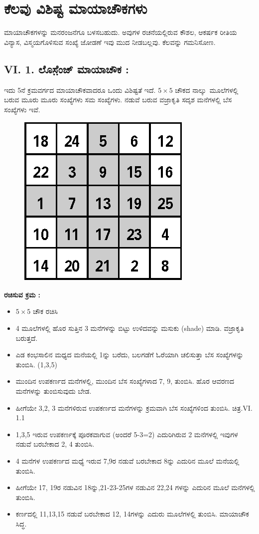 
\chapter{ಕೆಲವು ವಿಶಿಷ್ಟ ಮಾಯಾಚೌಕಗಳು}

ಮಾಯಾಚೌಕಗಳನ್ನು ಮನರಂಜನೆಗೂ ಬಳಸಬಹುದು. ಅವುಗಳ ರಚನೆಯಲ್ಲಿರುವ ಕೌಶಲ, ಆಕರ್ಷಕ ರೀತಿಯ ವಿನ್ಯಾಸ, ವಿಸ್ಮಯಗೊಳಿಸುವ ಸಂಖ್ಯೆ ಜೋಡಣೆ ಇವು ಮುದ ನೀಡಬಲ್ಲವು. ಕೆಲವನ್ನು ಗಮನಿಸೋಣ.

\section*{VI. 1. ಲೊಸೆ಼ಂಜ್ ಮಾಯಾಚೌಕ :}

ಇದು 5ನೆ ಕ್ರಮವರ್ಗದ ಮಾಯಾಚೌಕವಾದರೂ ಒಂದು ವಿಶಿಷ್ಟತೆ ಇದೆ. $5 \times 5$ ಚೌಕದ \hbox{ನಾಲ್ಕು ಮೂಲೆಗಳಲ್ಲಿ} ಬರುವ ಮೂರು ಮೂರು ಸಂಖ್ಯೆಗಳು ಸಮ ಸಂಖ್ಯೆಗಳು. ನಡುವೆ ಬರುವ ವಜ್ರಾಕೃತಿ ಸದೃಶ ಮನೆಗಳಲ್ಲಿ ಬೆಸ ಸಂಖ್ಯೆಗಳು ಇವೆ.
\begin{figure}[H]
\includegraphics{src/figures/chap5/fig5-1.eps}
\end{figure}

\noindent \textbf{ರಚಿಸುವ ಕ್ರಮ :}
\begin{itemize}
	\item $5 \times 5$ ಚೌಕ ರಚಿಸಿ
	\item 4 ಮೂಲೆಗಳಲ್ಲಿ ಹೊರ ಸುತ್ತಿನ 3 ಮನೆಗಳನ್ನು ಬಿಟ್ಟು ಉಳಿದವನ್ನು ಮಸುಕು (shade) ಮಾಡಿ. ವಜ್ರಾಕೃತಿ ಬರುತ್ತದೆ.
	\item ಎಡ ಕಂಭಸಾಲಿನ ಮಧ್ಯದ ಮನೆಯಲ್ಲಿ 1ನ್ನು ಬರೆದು, ಬಲಗಡೆಗೆ ಓರೆಯಾಗಿ ಚಲಿಸುತ್ತಾ ಬೆಸ ಸಂಖ್ಯೆಗಳನ್ನು ತುಂಬಿಸಿ. (1,3,5)
	\item ಮುಂದಿನ ಉಪಕರ್ಣದ ಮನೆಗಳಲ್ಲಿ, ಮುಂದಿನ ಬೆಸ ಸಂಖ್ಯೆಗಳಾದ 7, 9, ತುಂ\-ಬಿಸಿ. ಹೊರ ಆವರಣದ ಮನೆಗಳನ್ನು ತುಂಬಿಸುವುದು ಬೇಡ.
	\item ಹೀಗೆಯೇ 3,2, 3 ಮನೆಗಳಿರುವ ಉಪಕರ್ಣದ ಮನೆಗಳನ್ನು ಕ್ರಮವಾಗಿ ಬೆಸ ಸಂಖ್ಯೆ\-ಗಳಿಂದ ತುಂಬಿಸಿ. ಚಿತ್ರ.VI. 1.1
	\item 1,3,5 ಇರುವ ಉಪಕರ್ಣಕ್ಕೆ ಪೂರಕವಾಗುವ (ಅಂದರೆ 5-3=2) ಎದುರಿಗಿರುವ 2 ಮನೆಗಳಲ್ಲಿ ಇವುಗಳ ನಡುವೆ ಬರಬೇಕಾದ 2, 4 ತುಂಬಿಸಿ.
	\item 4 ಮನೆಗಳ ಉಪಕರ್ಣದ ಮಧ್ಯೆ ಇರುವ 7,9ರ ನಡುವೆ ಬರಬೇಕಾದ 8ನ್ನು ಎದುರಿನ ಮೂಲೆ ಮನೆಯಲ್ಲಿ ತುಂಬಿಸಿ.
	\item ಹೀಗೆಯೇ 17, 19ರ ನಡುವಿನ 18ನ್ನು,21-23-25ಗಳ ನಡುವಿನ 22,24 ಗಳನ್ನು ಎದುರಿನ ಮೂಲೆ ಮನೆಗಳಲ್ಲಿ ತುಂಬಿಸಿ.
	\item ಕರ್ಣದಲ್ಲಿ 11,13,15 ನಡುವೆ ಬರಬೇಕಾದ 12, 14ಗಳನ್ನು ಎದುರು ಮೂಲೆಗಳಲ್ಲಿ ತುಂಬಿಸಿ. ಮಾಯಾಚೌಕ ಸಿದ್ಧ.
\end{itemize}

